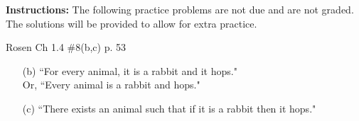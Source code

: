 \documentclass[12pt,addpoints]{exam}
\newcommand{\ra}{\rightarrow}
\begin{document}
\extrawidth{0.5in} \extrafootheight{-0.75in} \pagestyle{headandfoot}
\headrule {} \footrule {}

\noindent \textbf{Instructions:} The following practice problems are
not due and are not graded.  The solutions will be provided to allow
for extra practice.


\begin{questions}

\printanswers

\question Rosen Ch 1.4 \#8(b,c) p. 53
    \begin{solution}
    \begin{itemize}
        \item[(b)] ``For every animal, it is a rabbit and it hops." \\Or, ``Every animal is a rabbit and hops."
        \item[(c)] ``There exists an animal such that if it is a rabbit then it hops."
    \end{itemize}
    \end{solution}


\end{questions}
\end{document}
